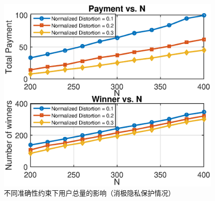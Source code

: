 	
	\begin{figure}[!t]
			\centering
			\includegraphics[scale=0.84]{./pic/externalities.eps}
			\caption{不同准确性约束下用户总量的影响（消极隐私保护情况）}\label{fg:externalities1}
	\end{figure}
